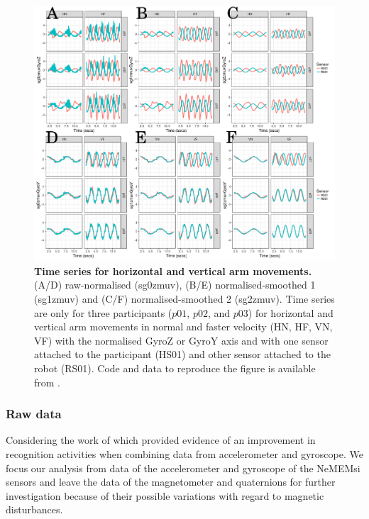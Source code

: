 \documentclass[fleqn,10pt]{wlscirep}
\begin{document}
\begin{figure}[ht]
\centering
\includegraphics[width=1.0\textwidth]{figures/timeseries/pdf/fig1}
    	\caption{ 
	{\bf Time series for horizontal and vertical arm movements.}
		(A/D) raw-normalised (sg0zmuv), 
		(B/E) normalised-smoothed 1 (sg1zmuv) and
		(C/F) normalised-smoothed 2 (sg2zmuv).
		Time series are only for three participants 
		($p01$, $p02$, and $p03$) 
		for horizontal and vertical arm movements in normal 
		and faster velocity (HN, HF, VN, VF) 
		with the normalised GyroZ or GyroY axis 
		and with one sensor attached to the participant (HS01) 
		and other sensor attached to the robot (RS01).	
	Code and data to reproduce the figure is available from \cite{srep2019}.
        }
    \label{fig:ts}
\end{figure}




\subsubsection*{Raw data}
Considering the work of \cite{shoaib2016} which provided evidence of an 
improvement in recognition activities when combining data from 
accelerometer and gyroscope. We focus our analysis from data of the 
accelerometer and gyroscope of the NeMEMsi sensors \cite{Comotti2014} and 
leave the data of the magnetometer and quaternions for further investigation 
because of their possible variations with regard to magnetic disturbances.
\end{document}
